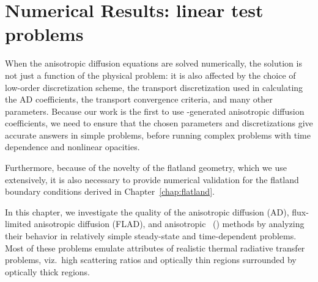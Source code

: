 
\chapter{Numerical Results: linear test problems}\label{chap:simpleNumericalResults}

When the anisotropic diffusion equations are solved numerically, the solution
is not just a function of the physical problem: it is also affected by the
choice
of low-order discretization scheme, the transport discretization used in
calculating the AD coefficients, the transport convergence criteria, and many
other parameters.
Because our work is the first to use \SN-generated anisotropic diffusion
coefficients, we need to ensure that the chosen parameters and
discretizations give accurate answers in simple problems, before running
complex problems with time dependence and nonlinear opacities.

Furthermore, because of the novelty of the
flatland geometry, which we use extensively, it is also necessary to provide
numerical validation for the flatland boundary conditions derived in
Chapter~\ref{chap:flatland}.

In this chapter, we investigate the quality of the
anisotropic diffusion (AD), flux-limited anisotropic diffusion (FLAD), and
anisotropic \Pone\ (\APone) methods by analyzing their behavior in relatively
simple steady-state
and time-dependent problems. Most of these problems emulate attributes of
realistic thermal radiative transfer problems, viz.~high scattering ratios and
optically thin regions surrounded by optically thick regions.

